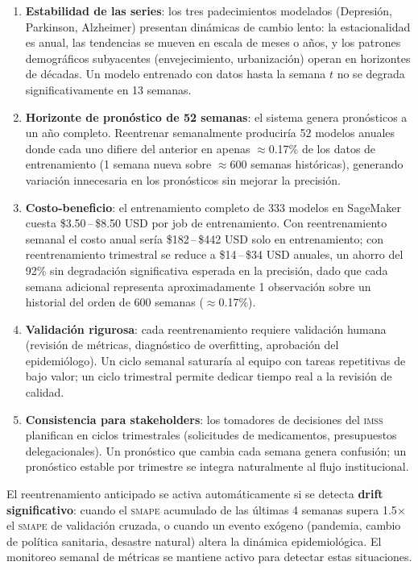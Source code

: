 \documentclass[12pt, letterpaper]{article}
\newcommand{\smape}{\textnormal{\textsc{smape}}}
\newcommand{\imss}{\textnormal{\textsc{imss}}}
\begin{document}
\begin{enumerate}[noitemsep]
    \item \textbf{Estabilidad de las series}: los tres padecimientos modelados (Depresión, Parkinson, Alzheimer) presentan dinámicas de cambio lento: la estacionalidad es anual, las tendencias se mueven en escala de meses o años, y los patrones demográficos subyacentes (envejecimiento, urbanización) operan en horizontes de décadas. Un modelo entrenado con datos hasta la semana $t$ no se degrada significativamente en 13 semanas.
    \item \textbf{Horizonte de pronóstico de 52 semanas}: el sistema genera pronósticos a un año completo. Reentrenar semanalmente produciría 52 modelos anuales donde cada uno difiere del anterior en apenas $\approx$0.17\% de los datos de entrenamiento (1 semana nueva sobre $\approx$600 semanas históricas), generando variación innecesaria en los pronósticos sin mejorar la precisión.
    \item \textbf{Costo-beneficio}: el entrenamiento completo de 333 modelos en SageMaker cuesta \$3.50\,--\,\$8.50 USD por job de entrenamiento. Con reentrenamiento semanal el costo anual sería \$182\,--\,\$442 USD solo en entrenamiento; con reentrenamiento trimestral se reduce a \$14\,--\,\$34 USD anuales, un ahorro del 92\% sin degradación significativa esperada en la precisión, dado que cada semana adicional representa aproximadamente 1 observación sobre un historial del orden de 600 semanas ($\approx$0.17\%).
    \item \textbf{Validación rigurosa}: cada reentrenamiento requiere validación humana (revisión de métricas, diagnóstico de overfitting, aprobación del epidemiólogo). Un ciclo semanal saturaría al equipo con tareas repetitivas de bajo valor; un ciclo trimestral permite dedicar tiempo real a la revisión de calidad.
    \item \textbf{Consistencia para stakeholders}: los tomadores de decisiones del {\imss} planifican en ciclos trimestrales (solicitudes de medicamentos, presupuestos delegacionales). Un pronóstico que cambia cada semana genera confusión; un pronóstico estable por trimestre se integra naturalmente al flujo institucional.
\end{enumerate}

\begin{warningbox}
El reentrenamiento anticipado se activa automáticamente si se detecta \textbf{drift significativo}: cuando el \smape{} acumulado de las últimas 4 semanas supera 1.5$\times$ el \smape{} de validación cruzada, o cuando un evento exógeno (pandemia, cambio de política sanitaria, desastre natural) altera la dinámica epidemiológica. El monitoreo semanal de métricas se mantiene activo para detectar estas situaciones.
\end{warningbox}
\end{document}
